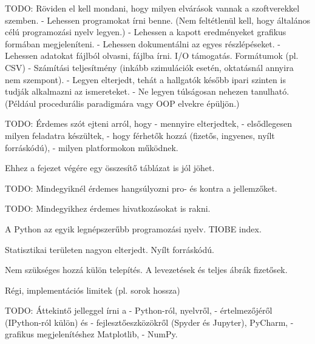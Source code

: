 

TODO: Röviden el kell mondani, hogy milyen elvárások vannak a szoftverekkel szemben.
- Lehessen programokat írni benne. (Nem feltétlenül kell, hogy általános célú programozási nyelv legyen.)
- Lehessen a kapott eredményeket grafikus formában megjeleníteni.
- Lehessen dokumentálni az egyes részlépéseket.
- Lehessen adatokat fájlból olvasni, fájlba írni. I/O támogatás. Formátumok (pl. CSV)
- Számítási teljesítmény (inkább szimulációk esetén, oktatásnál annyira nem szempont).
- Legyen elterjedt, tehát a hallgatók később ipari szinten is tudják alkalmazni az ismereteket.
- Ne legyen túlságosan nehezen tanulható. (Például procedurális paradigmára vagy OOP elvekre épüljön.)


TODO: Érdemes szót ejteni arról, hogy
- mennyire elterjedtek,
- elsődlegesen milyen feladatra készültek,
- hogy férhetők hozzá (fizetős, ingyenes, nyílt forráskódú),
- milyen platformokon működnek.

Ehhez a fejezet végére egy összesítő táblázat is jól jöhet. 

TODO: Mindegyiknél érdemes hangsúlyozni pro- és kontra a jellemzőket.

TODO: Mindegyikhez érdemes hivatkozásokat is rakni.



A Python az egyik legnépszerűbb programozási nyelv.
TIOBE index.


Statisztikai területen nagyon elterjedt.
Nyílt forráskódú.



Nem szükséges hozzá külön telepítés.
A levezetések és teljes ábrák fizetősek.


Régi, implementációs limitek (pl. sorok hossza)


TODO: Áttekintő jelleggel írni a
- Python-ról, nyelvről,
- értelmezőjéről (IPython-ról külön) és
- fejlesztőeszközökről (Spyder és Jupyter), PyCharm,
- grafikus megjelenítéshez Matplotlib,
- NumPy.
